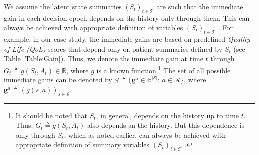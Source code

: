 \documentclass[opre,nonblindrev]{informs2}%
\newcommand{\teq}{\triangleq}
\newcommand{\1}{\hbox{\rm 1\kern-.35em 1}}
\newcommand{\MS}{\mathscr S}
\newcommand{\MA}{\mathscr A}
\newcommand{\MG}{\mathscr G}
\newcommand{\MT}{\mathscr T}
\newcommand{\g}{\mathbf{g}}
\begin{document}
We assume the latent state summaries $(S_t)_{t\in\MT}$ are such that the immediate gain in each decision epoch depends on the history only through them. This can always be achieved with appropriate definition of  variables $(S_t)_{t\in\MT}$ \citep[see, e.g.,][]{Xu2020}.   For example, in our case study, the immediate gains are based on predefined {\em Quality of Life (QoL)} scores that depend only on  patient summaries defined by  $S_t$ (see Table \ref{Table:Gain}). Thus, we denote the immediate gain at time $t$ through $G_t\teq g (S_t, A_t)\in\mathbb R$, where $g$ is a known function.\footnote{It should be noted that $S_t$, in general,  depends on the history up to time $t$. Thus, $G_t\teq g (S_t, A_t)$ also depends on the history. But this dependence is only through $S_t$, which as noted earlier, can always be achieved with appropriate definition of  summary variables $(S_t)_{t\in\MT}$ \citep[see, e.g.,][]{Xu2020}.}  The set of all possible immediate gains can be denoted by $\MG\teq\{\g^a\in \mathbb R^{|\MS|}:\, a\in \MA\}$, where $\g^a\teq (g(s, a))_{s\in\MS}$.
\end{document}
